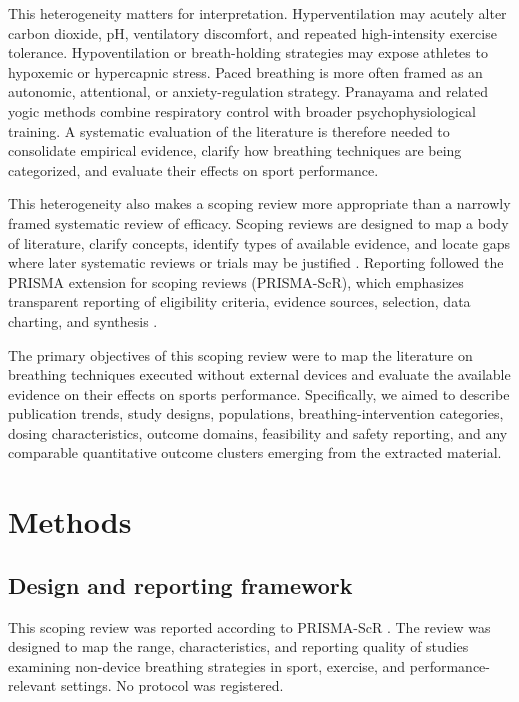 \documentclass[11pt,a4paper]{article}
\begin{document}
This heterogeneity matters for interpretation. Hyperventilation may acutely alter carbon dioxide, pH, ventilatory discomfort, and repeated high-intensity exercise tolerance. Hypoventilation or breath-holding strategies may expose athletes to hypoxemic or hypercapnic stress. Paced breathing is more often framed as an autonomic, attentional, or anxiety-regulation strategy. Pranayama and related yogic methods combine respiratory control with broader psychophysiological training. A systematic evaluation of the literature is therefore needed to consolidate empirical evidence, clarify how breathing techniques are being categorized, and evaluate their effects on sport performance.

This heterogeneity also makes a scoping review more appropriate than a narrowly framed systematic review of efficacy. Scoping reviews are designed to map a body of literature, clarify concepts, identify types of available evidence, and locate gaps where later systematic reviews or trials may be justified \parencite{arksey2005scoping,levac2010scoping,peters2020jbi}. Reporting followed the PRISMA extension for scoping reviews (PRISMA-ScR), which emphasizes transparent reporting of eligibility criteria, evidence sources, selection, data charting, and synthesis \parencite{tricco2018prisma}.

The primary objectives of this scoping review were to map the literature on breathing techniques executed without external devices and evaluate the available evidence on their effects on sports performance. Specifically, we aimed to describe publication trends, study designs, populations, breathing-intervention categories, dosing characteristics, outcome domains, feasibility and safety reporting, and any comparable quantitative outcome clusters emerging from the extracted material.

\section{Methods}
\subsection{Design and reporting framework}
This scoping review was reported according to PRISMA-ScR \parencite{tricco2018prisma}. The review was designed to map the range, characteristics, and reporting quality of studies examining non-device breathing strategies in sport, exercise, and performance-relevant settings. No protocol was registered.
\end{document}
